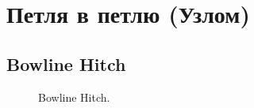 \section{Петля в петлю (Узлом)}

\subsection{Bowline Hitch}

\begin{figure}[H]\centering
	\begin{minipage}{1\linewidth}
		\begin{center}
			\tcbox[enhanced jigsaw,colframe=black,opacityframe=0.5,opacityback=0.5]
			{\centering{}}
		\end{center}
	\end{minipage}
	\caption{Bowline Hitch.}
	\label{ris:Bowline_Hitch}
\end{figure}
